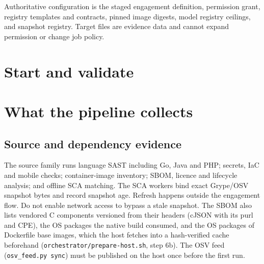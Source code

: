 \documentclass[10pt,a4paper]{article}
\begin{document}
Authoritative configuration is the staged engagement definition, permission grant, registry
templates and contracts, pinned image digests, model registry ceilings, and snapshot registry.
Target files are evidence data and cannot expand permission or change job policy.

\section{Start and validate}
\begin{steps}
\end{steps}

\section{What the pipeline collects}
\subsection{Source and dependency evidence}
The source family runs language SAST including Go, Java and PHP; secrets, IaC and mobile checks;
container-image inventory; SBOM, licence and lifecycle analysis; and offline SCA matching. The SCA
workers bind exact Grype/OSV snapshot bytes and record snapshot age. Refresh happens outside the
engagement flow. Do not enable network access to bypass a stale snapshot. The SBOM also lists
vendored C components versioned from their headers (cJSON with its purl and CPE), the OS packages
the native build consumed, and the OS packages of Dockerfile base images, which the host fetches into
a hash-verified cache beforehand (\texttt{orchestrator/prepare-host.sh}, step 6b). The OSV feed
(\texttt{osv\_feed.py sync}) must be published on the host once before the first run.
\end{document}
